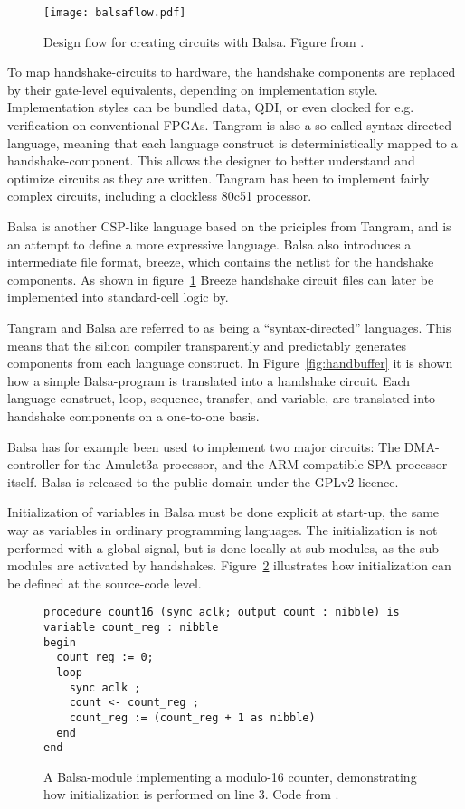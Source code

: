 \begin{figure}[htbp]
  \centering
  \texttt{[image: balsaflow.pdf]}
  \caption{Design flow for creating circuits with Balsa. Figure from
    \cite{tut}.}
  \label{fig:balsaflow}
\end{figure}


To map handshake-circuits to hardware, the handshake components are
replaced by their gate-level equivalents, depending on implementation
style. Implementation styles can be bundled data, QDI, or even clocked
for e.g. verification on conventional FPGAs. Tangram is also a so
called syntax-directed language, meaning that each language construct
is deterministically mapped to a handshake-component. This allows the
designer to better understand and optimize circuits as they are
written. Tangram has been to implement fairly complex circuits,
including a clockless 80c51 processor\cite{80c51}.

Balsa\cite{tut} is another CSP-like language based on the priciples
from Tangram, and is an attempt to define a more expressive
language. Balsa also introduces a intermediate file format, breeze,
which contains the netlist for the handshake components. As shown in
figure~\ref{fig:balsaflow} Breeze handshake circuit files can later be
implemented into standard-cell logic by.

Tangram and Balsa are referred to as being a ``syntax-directed''
languages. This means that the silicon compiler transparently and
predictably generates components from each language construct. In
Figure~\ref{fig:handbuffer} it is shown how a simple Balsa-program is
translated into a handshake circuit. Each language-construct, loop,
sequence, transfer, and variable, are translated into handshake
components on a one-to-one basis.

Balsa has for example been used to implement two major circuits: The
DMA-controller for the Amulet3a processor, and the ARM-compatible SPA
processor itself. Balsa is released to the public domain under the
GPLv2 licence.

\label{par:init}
Initialization of variables in Balsa must be done explicit at
start-up, the same way as variables in ordinary programming
languages. The initialization is not performed with a global signal,
but is done locally at sub-modules, as the sub-modules are activated
by handshakes. Figure~\ref{fig:init} illustrates how initialization
can be defined at the source-code level.

\begin{figure}[htbp]
\begin{lstlisting}
procedure count16 (sync aclk; output count : nibble) is
variable count_reg : nibble
begin
  count_reg := 0;
  loop
    sync aclk ;
    count <- count_reg ;
    count_reg := (count_reg + 1 as nibble)
  end
end
\end{lstlisting}
\caption{A Balsa-module implementing a modulo-16 counter,
  demonstrating how initialization is performed on line 3. Code from
  \cite{tut}.}
\label{fig:init}
\end{figure}


